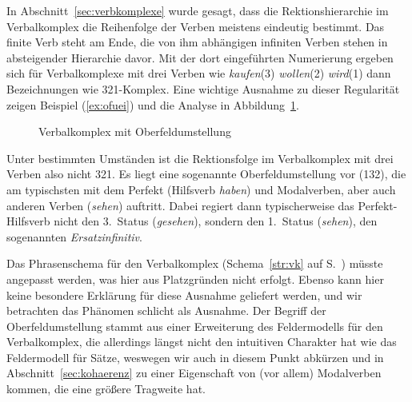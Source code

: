 \label{sec:ersiofu}


In Abschnitt~\ref{sec:verbkomplexe} wurde gesagt, dass die Rektionshierarchie im Verbalkomplex die Reihenfolge der Verben meistens eindeutig bestimmt.
Das finite Verb steht am Ende, die von ihm abhängigen infiniten Verben stehen in absteigender Hierarchie davor.
Mit der dort eingeführten Numerierung ergeben sich für Verbalkomplexe mit drei Verben wie \textit{kaufen}(3) \textit{wollen}(2) \textit{wird}(1) dann Bezeichnungen wie 321-Komplex.
Eine wichtige Ausnahme zu dieser Regularität zeigen Beispiel (\ref{ex:ofuei}) und die Analyse in Abbildung~\ref{fig:oberfeldum}.

\begin{exe}
\end{exe}

\begin{figure}
  \centering
  \caption{Verbalkomplex mit Oberfeldumstellung}
  \label{fig:oberfeldum}
\end{figure}

Unter bestimmten Umständen ist die Rektionsfolge im Verbalkomplex mit drei Verben also nicht 321.
Es liegt eine sogenannte Oberfeldumstellung vor (132), die am typischsten mit dem Perfekt (Hilfsverb \textit{haben}) und Modalverben, aber auch anderen Verben (\zB \textit{sehen}) auftritt.
Dabei regiert dann typischerweise das Perfekt-Hilfsverb nicht den 3.~Status (\textit{gesehen}), sondern den 1.~Status (\textit{sehen}), den sogenannten \textit{Ersatzinfinitiv}.


Das Phrasenschema für den Verbalkomplex (Schema~\ref{str:vk} auf S.~\pageref{str:vk}) müsste angepasst werden, was hier aus Platzgründen nicht erfolgt.
Ebenso kann hier keine besondere Erklärung für diese Ausnahme geliefert werden, und wir betrachten das Phänomen schlicht als Ausnahme.
Der Begriff der Oberfeldumstellung stammt aus einer Erweiterung des Feldermodells für den Verbalkomplex, die allerdings längst nicht den intuitiven Charakter hat wie das Feldermodell für Sätze, weswegen wir auch in diesem Punkt abkürzen und in Abschnitt~\ref{sec:kohaerenz} zu einer Eigenschaft von (vor allem) Modalverben kommen, die eine größere Tragweite hat.


